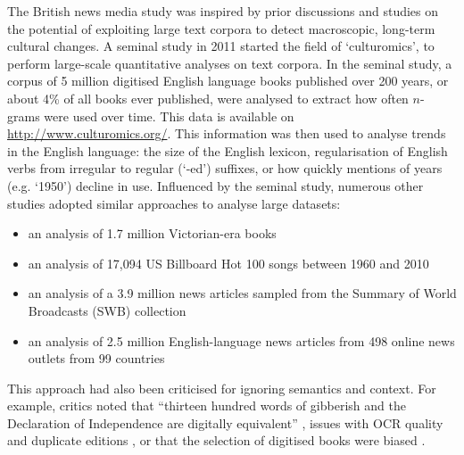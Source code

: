 \documentclass{report}
\begin{document}
The British news media study was inspired by prior discussions and studies on the potential of exploiting large text corpora to detect macroscopic, long-term cultural changes. 
A seminal study in 2011 \cite{michel2011quantitative} started the field of `culturomics', to perform large-scale quantitative analyses on text corpora.
In the seminal study, a corpus of 5 million digitised English language books published over 200 years, or about 4\% of all books ever published, were analysed to extract how often $n$-grams were used over time.
This data is available on \url{http://www.culturomics.org/}.
This information was then used to analyse trends in the English language: the size of the English lexicon, regularisation of English verbs from irregular to regular (`-ed') suffixes, or how quickly mentions of years (e.g. `1950') decline in use.
Influenced by the seminal study, numerous other studies adopted similar approaches to analyse large datasets: 
\begin{itemize}
	\item an analysis of 1.7 million Victorian-era books \cite{gibbs2011conversation}
	\item an analysis of 17,094 US Billboard Hot 100 songs between 1960 and 2010 \cite{mauch2015evolution}
	\item an analysis of a 3.9 million news articles sampled from the Summary of World Broadcasts (SWB) collection \cite{leetaru2011culturomics}
	\item an analysis of 2.5 million English-language news articles from 498 online news outlets from 99 countries \cite{flaounas2013research}
\end{itemize}
This approach had also been criticised for ignoring semantics and context.
For example, critics noted that ``thirteen hundred words of gibberish and the Declaration of Independence are digitally equivalent'' \cite{gooding2013mass}, issues with OCR quality and duplicate editions \cite{gooding2013mass}, or that the selection of digitised books were biased \cite{schwartz2011culturomics}.
\end{document}
